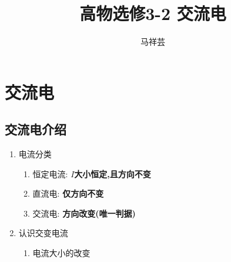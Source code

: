 \documentclass{article}
\title{高物选修3-2 \quad 交流电}
\author{马祥芸}
\begin{document}
    \maketitle
    \tableofcontents
    \newpage

    \section{交流电}  

    \subsection{交流电介绍}

    \begin{enumerate}
        \item 电流分类
        \begin{enumerate}[label=(\arabic*)]
            \item 恒定电流: \quad \textbf{$I$大小恒定,且方向不变}
            \item 直流电: \quad \textbf{仅方向不变}
            \item 交流电: \quad \textbf{方向改变(唯一判据)}
        \end{enumerate}

        \item 认识交变电流
        \begin{enumerate}[label=(\arabic*)]
            \item 电流大小的改变
            \begin{figure}[h] %
                \centering
                

\end{figure}
\end{enumerate}
\end{enumerate}
\end{document}
